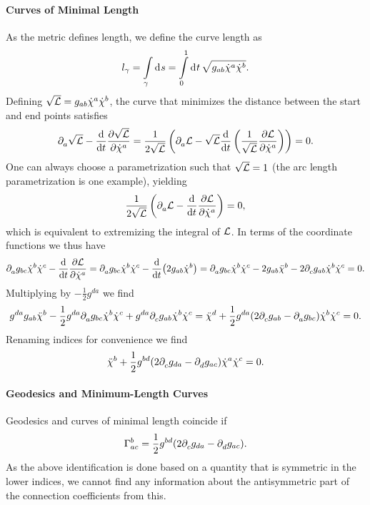 \paragraph{Curves of Minimal Length}
As the metric defines length, we define the curve length as
\begin{align*}
	l_{\gamma} = \int\limits_{\gamma}^{}\dd[]{s} = \int\limits_{0}^{1}\dd[]{t}\sqrt{g_{ab}\dot{\chi}^{a}\dot{\chi}^{b}}.
\end{align*}
Defining $\sqrt{\mathcal{L}} = g_{ab}\dot{\chi}^{a}\dot{\chi}^{b}$, the curve that minimizes the distance between the start and end points satisfies
\begin{align*}
	\partial^{}_{a}\sqrt{\mathcal{L}} - \dv{t}\pdv{\sqrt{\ensuremath{\mathcal{L}}}}{\dot{\chi}^{a}} = \frac{1}{2\sqrt{\mathcal{L}}}\left(\partial^{}_{a}\mathcal{L} - \sqrt{\mathcal{L}}\dv{t}\left(\frac{1}{\sqrt{\mathcal{L}}}\pdv{\ensuremath{\mathcal{L}}}{\dot{\chi}^{a}}\right)\right) = 0.
\end{align*}
One can always choose a parametrization such that $\sqrt{\mathcal{L}} = 1$ (the arc length parametrization is one example), yielding
\begin{align*}
	\frac{1}{2\sqrt{\mathcal{L}}}\left(\partial^{}_{a}\mathcal{L} - \dv{t}\pdv{\ensuremath{\mathcal{L}}}{\dot{\chi}^{a}}\right) = 0,
\end{align*}
which is equivalent to extremizing the integral of $\mathcal{L}$. In terms of the coordinate functions we thus have
\begin{align*}
	\partial^{}_{a}g_{bc}\dot{\chi}^{b}\dot{\chi}^{c} - \dv{t}\pdv{\ensuremath{\mathcal{L}}}{\dot{\chi}^{a}} = \partial^{}_{a}g_{bc}\dot{\chi}^{b}\dot{\chi}^{c} - \dv{t}(2g_{ab}\dot{\chi}^{b}) = \partial^{}_{a}g_{bc}\dot{\chi}^{b}\dot{\chi}^{c} - 2g_{ab}\ddot{\chi}^{b} - 2\partial^{}_{c}g_{ab}\dot{\chi}^{b}\dot{\chi}^{c} = 0.
\end{align*}
Multiplying by $-\frac{1}{2}g^{da}$ we find
\begin{align*}
	g^{da}g_{ab}\ddot{\chi}^{b} - \frac{1}{2}g^{da}\partial^{}_{a}g_{bc}\dot{\chi}^{b}\dot{\chi}^{c} + g^{da}\partial^{}_{c}g_{ab}\dot{\chi}^{b}\dot{\chi}^{c} = \ddot{\chi}^{d} + \frac{1}{2}g^{da}(2\partial^{}_{c}g_{ab} - \partial^{}_{a}g_{bc})\dot{\chi}^{b}\dot{\chi}^{c} = 0.
\end{align*}
Renaming indices for convenience we find
\begin{align*}
	\ddot{\chi}^{b} + \frac{1}{2}g^{bd}(2\partial^{}_{c}g_{da} - \partial^{}_{d}g_{ac})\dot{\chi}^{a}\dot{\chi}^{c} = 0.
\end{align*}

\paragraph{Geodesics and Minimum-Length Curves}
Geodesics and curves of minimal length coincide if
\begin{align*}
	\chris{b}{a}{c} = \frac{1}{2}g^{bd}(2\del{c}{g_{da}} - \del{d}{g_{ac}}).
\end{align*}
As the above identification is done based on a quantity that is symmetric in the lower indices, we cannot find any information about the antisymmetric part of the connection coefficients from this.

